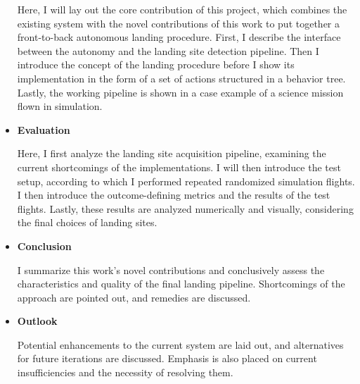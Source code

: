 \begin{itemize}
    Here, I will lay out the core contribution of this project, which combines the existing system with the novel contributions of this work to put together a front-to-back autonomous landing procedure. First, I describe the interface between the autonomy and the landing site detection pipeline. Then I introduce the concept of the landing procedure before I show its implementation in the form of a set of actions structured in a behavior tree. Lastly, the working pipeline is shown in a case example of a science mission flown in simulation.
    \item \textbf{Evaluation}

    Here, I first analyze the landing site acquisition pipeline, examining the current shortcomings of the implementations. I will then introduce the test setup, according to which I performed repeated randomized simulation flights. I then introduce the outcome-defining metrics and the results of the test flights. Lastly, these results are analyzed numerically and visually, considering the final choices of landing sites.
    \item \textbf{Conclusion}

    I summarize this work's novel contributions and conclusively assess the characteristics and quality of the final landing pipeline. Shortcomings of the approach are pointed out, and remedies are discussed.

    \item \textbf{Outlook}

    Potential enhancements to the current system are laid out, and alternatives for future iterations are discussed. Emphasis is also placed on current insufficiencies and the necessity of resolving them.
\end{itemize}